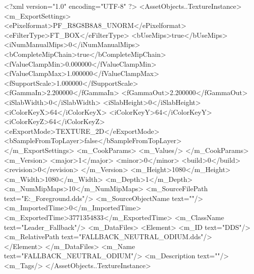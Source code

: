 <?xml version="1.0" encoding="UTF-8" ?>
<AssetObjects..TextureInstance>
	<m_ExportSettings>
		<ePixelformat>PF_R8G8B8A8_UNORM</ePixelformat>
		<eFilterType>FT_BOX</eFilterType>
		<bUseMips>true</bUseMips>
		<iNumManualMips>0</iNumManualMips>
		<bCompleteMipChain>true</bCompleteMipChain>
		<fValueClampMin>0.000000</fValueClampMin>
		<fValueClampMax>1.000000</fValueClampMax>
		<fSupportScale>1.000000</fSupportScale>
		<fGammaIn>2.200000</fGammaIn>
		<fGammaOut>2.200000</fGammaOut>
		<iSlabWidth>0</iSlabWidth>
		<iSlabHeight>0</iSlabHeight>
		<iColorKeyX>64</iColorKeyX>
		<iColorKeyY>64</iColorKeyY>
		<iColorKeyZ>64</iColorKeyZ>
		<eExportMode>TEXTURE_2D</eExportMode>
		<bSampleFromTopLayer>false</bSampleFromTopLayer>
	</m_ExportSettings>
	<m_CookParams>
		<m_Values/>
	</m_CookParams>
	<m_Version>
		<major>1</major>
		<minor>0</minor>
		<build>0</build>
		<revision>0</revision>
	</m_Version>
	<m_Height>1080</m_Height>
	<m_Width>1080</m_Width>
	<m_Depth>1</m_Depth>
	<m_NumMipMaps>10</m_NumMipMaps>
	<m_SourceFilePath text="E:\Jordi\Escritorio\ModdingIcons\stormlight\potraits\Odium_Foreground.dds"/>
	<m_SourceObjectName text=""/>
	<m_ImportedTime>0</m_ImportedTime>
	<m_ExportedTime>3771354833</m_ExportedTime>
	<m_ClassName text="Leader_Fallback"/>
	<m_DataFiles>
		<Element>
			<m_ID text="DDS"/>
			<m_RelativePath text="FALLBACK_NEUTRAL_ODIUM.dds"/>
		</Element>
	</m_DataFiles>
	<m_Name text="FALLBACK_NEUTRAL_ODIUM"/>
	<m_Description text=""/>
	<m_Tags/>
</AssetObjects..TextureInstance>

